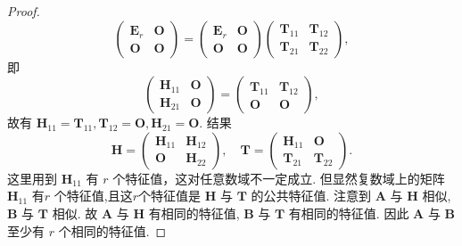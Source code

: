 \documentclass[../../main.tex]{subfiles}
\begin{document}
\begin{proof}
\[\begin{pmatrix}
\boldsymbol{E}_r & \boldsymbol{O} \\
\boldsymbol{O} & \boldsymbol{O} 
\end{pmatrix} = \begin{pmatrix} 
\boldsymbol{E}_r & \boldsymbol{O} \\
\boldsymbol{O} & \boldsymbol{O} 
\end{pmatrix} \begin{pmatrix} 
\boldsymbol{T}_{11} & \boldsymbol{T}_{12} \\
\boldsymbol{T}_{21} & \boldsymbol{T}_{22} 
\end{pmatrix},
\]
即
\[
\begin{pmatrix} 
\boldsymbol{H}_{11} & \boldsymbol{O} \\
\boldsymbol{H}_{21} & \boldsymbol{O} 
\end{pmatrix} = \begin{pmatrix} 
\boldsymbol{T}_{11} & \boldsymbol{T}_{12} \\
\boldsymbol{O} & \boldsymbol{O} 
\end{pmatrix},
\]
故有 $\boldsymbol{H}_{11} = \boldsymbol{T}_{11}, \boldsymbol{T}_{12} = \boldsymbol{O}, \boldsymbol{H}_{21} = \boldsymbol{O}$. 结果
\[
\boldsymbol{H} = \begin{pmatrix} 
\boldsymbol{H}_{11} & \boldsymbol{H}_{12} \\
\boldsymbol{O} & \boldsymbol{H}_{22} 
\end{pmatrix}, \quad \boldsymbol{T} = \begin{pmatrix} 
\boldsymbol{H}_{11} & \boldsymbol{O} \\
\boldsymbol{T}_{21} & \boldsymbol{T}_{22} 
\end{pmatrix}.
\]
这里用到 $\boldsymbol{H}_{11}$ 有 $r$ 个特征值，这对任意数域不一定成立. 但显然复数域上的矩阵 $\boldsymbol{H}_{11}$ 有$r$ 个特征值,且这$r$个特征值是 $\boldsymbol{H}$ 与 $\boldsymbol{T}$ 的公共特征值. 注意到 $\boldsymbol{A}$ 与 $\boldsymbol{H}$ 相似, $\boldsymbol{B}$ 与 $\boldsymbol{T}$ 相似. 故 $\boldsymbol{A}$ 与 $\boldsymbol{H}$ 有相同的特征值, $\boldsymbol{B}$ 与 $\boldsymbol{T}$ 有相同的特征值. 因此 $\boldsymbol{A}$ 与 $\boldsymbol{B}$ 至少有 $r$ 个相同的特征值.

\end{proof}
\end{document}
